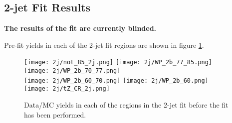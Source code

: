 



\subsection{2-jet Fit Results}

\textbf{The results of the fit are currently blinded.} 

Pre-fit yields in each of the 2-jet fit regions are shown in figure \ref{fig:prefit_2j}.

\begin{figure}[H]
    \center
    \texttt{[image: 2j/not\_85\_2j.png]}%
    \texttt{[image: 2j/WP\_2b\_77\_85.png]}%
    \texttt{[image: 2j/WP\_2b\_70\_77.png]}\\
    \texttt{[image: 2j/WP\_2b\_60\_70.png]}%
    \texttt{[image: 2j/WP\_2b\_60.png]}%
    \texttt{[image: 2j/tZ\_CR\_2j.png]}\\
    \caption{Data/MC yields in each of the regions in the 2-jet fit before the fit has been performed.}
    \label{fig:prefit_2j}
\end{figure}

